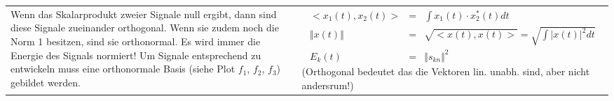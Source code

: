 \begin{tabular}{ll}
 \addtolength{\jot}{2mm}
 \parbox{5cm}{Wenn das Skalarprodukt zweier Signale null ergibt, dann sind diese Signale zueinander orthogonal. Wenn sie zudem noch die Norm 1 besitzen, sind sie orthonormal. Es wird immer die Energie des Signals normiert! Um Signale entsprechend zu entwickeln muss eine orthonormale Basis (siehe Plot $f_1$, $f_2$, $f_3$) gebildet werden. }
 &
 \parbox{7.5cm}{
 \begin{eqnarray*}
 < x_1(t) , x_2(t)> &=& \int x_1(t) \cdot x^*_2(t) dt\\
 \Vert x(t) \Vert  &=& \sqrt{ < x(t) , x(t)>} = \sqrt{\int \vert x(t) \vert^2 dt}\\
 E_k(t) &=& \Vert s_{kn} \Vert^2 
 \end{eqnarray*} (Orthogonal bedeutet das die Vektoren lin. unabh. sind, aber nicht andersrum!)}
\end{tabular}\\~

